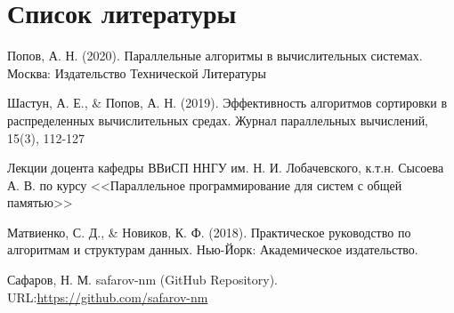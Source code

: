 \documentclass[a4paper, 14pt]{article}
\theoremstyle{plain}
\begin{document}
\newpage
\section*{\centering Список литературы}
\begin{enumerate}[label={[\arabic*]}]
	\item Попов, А. Н. (2020). Параллельные алгоритмы в вычислительных системах. Москва: Издательство Технической Литературы
	\item Шастун, А. Е., \& Попов, А. Н. (2019). Эффективность алгоритмов сортировки в распределенных вычислительных средах. Журнал параллельных вычислений, 15(3), 112-127
	\item Лекции доцента кафедры ВВиСП ННГУ им. Н. И. Лобачевского, к.т.н. Сысоева А. В. по курсу <<Параллельное программирование для систем с общей памятью>>
	\item Матвиенко, С. Д., \& Новиков, К. Ф. (2018). Практическое руководство по алгоритмам и структурам данных. Нью-Йорк: Академическое издательство.
	\item Сафаров, Н. М. safarov-nm (GitHub Repository). URL:\href{https://github.com/safarov-nm}{https://github.com/safarov-nm}
\end{enumerate}

\newpage
\end{document}
